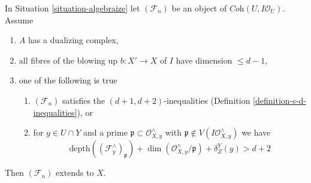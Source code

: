 \begin{lemma}
\label{lemma-blowup}
In Situation \ref{situation-algebraize} let $(\mathcal{F}_n)$
be an object of $\textit{Coh}(U, I\mathcal{O}_U)$. Assume
\begin{enumerate}
\item $A$ has a dualizing complex,
\item all fibres of the blowing up $b : X' \to X$ of $I$
have dimension $\leq d - 1$,
\item one of the following is true
\begin{enumerate}
\item $(\mathcal{F}_n)$ satisfies the $(d + 1, d + 2)$-inequalities
(Definition \ref{definition-s-d-inequalities}), or
\item for $y \in U \cap Y$ and a prime
$\mathfrak p \subset \mathcal{O}_{X, y}^\wedge$ with
$\mathfrak p \not \in V(I\mathcal{O}_{X, y}^\wedge)$
we have
$$
\text{depth}((\mathcal{F}^\wedge_y)_\mathfrak p) +
\dim(\mathcal{O}_{X, y}^\wedge/\mathfrak p) + \delta^Y_Z(y) > d + 2
$$
\end{enumerate}
\end{enumerate}
Then $(\mathcal{F}_n)$ extends to $X$.
\end{lemma}

